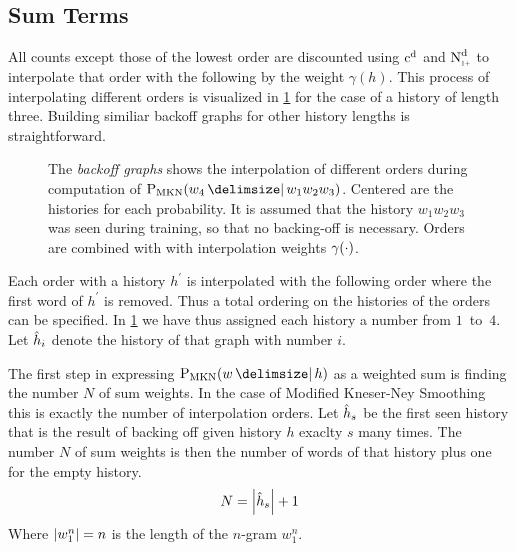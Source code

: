 \subsection{Sum Terms}

All counts except those of the lowest order are discounted using
$\DiscountedCount$ and $\DiscountedCount*$ to interpolate that order with the
following by the weight $\gamma(h)$.
This process of interpolating different orders is visualized in
\cref{fig:history-mkn} for the case of a history of length three.
Building similiar backoff graphs for other history lengths is straightforward.

\begin{figure}[tb]
  \centering
  
  \caption{
    The \emph{backoff graphs} shows the interpolation of different orders during
    computation of $\ProbMKN{w_4}{w_1 w_2 w_3}$.
    Centered are the histories for each probability.
    It is assumed that the history $w_1 w_2 w_3$ was seen during training, so
    that no backing-off is necessary.
    Orders are combined with with interpolation weights $\gamma(\cdot)$.
  }
  \label{fig:history-mkn}
\end{figure}

Each order with a history $h^\prime$ is interpolated with the following order where
the first word of $h^\prime$ is removed.
Thus a total ordering on the histories of the orders can be specified.
In \cref{fig:history-mkn} we have thus assigned each history a number from
$1$~to~$4$.
Let $\DerivedHistory[i]$ denote the history of that graph with number $i$.

The first step in expressing $\ProbMKN{w}{h}$ as a weighted sum is finding the
number $N$ of sum weights.
In the case of Modified Kneser-Ney Smoothing this is exactly the number of
interpolation orders.
Let $\DerivedHistory[s]$ be the first seen history that is the result of
backing off given history $h$ exaclty $s$ many times.
The number $N$ of sum weights is then the number of words of that history plus
one for the empty history.
\begin{equation}
  \label{eq:weightedsum-mkn-num}
  N = \NGramLength{\DerivedHistory[s]} + 1
\end{equation}
Where ${\left|w_1^n\right|} = n$ is the length of the $n$-gram $w_1^n$.

